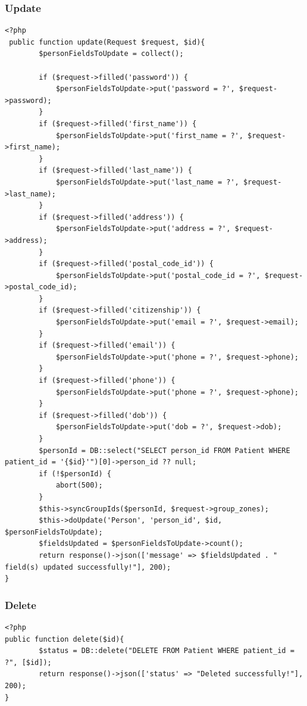 \documentclass{article}
\begin{document}
\subsubsection{Update}
\begin{verbatim}
<?php
 public function update(Request $request, $id){
        $personFieldsToUpdate = collect();

        if ($request->filled('password')) {
            $personFieldsToUpdate->put('password = ?', $request->password);
        }
        if ($request->filled('first_name')) {
            $personFieldsToUpdate->put('first_name = ?', $request->first_name);
        }
        if ($request->filled('last_name')) {
            $personFieldsToUpdate->put('last_name = ?', $request->last_name);
        }
        if ($request->filled('address')) {
            $personFieldsToUpdate->put('address = ?', $request->address);
        }
        if ($request->filled('postal_code_id')) {
            $personFieldsToUpdate->put('postal_code_id = ?', $request->postal_code_id);
        }
        if ($request->filled('citizenship')) {
            $personFieldsToUpdate->put('email = ?', $request->email);
        }
        if ($request->filled('email')) {
            $personFieldsToUpdate->put('phone = ?', $request->phone);
        }
        if ($request->filled('phone')) {
            $personFieldsToUpdate->put('phone = ?', $request->phone);
        }
        if ($request->filled('dob')) {
            $personFieldsToUpdate->put('dob = ?', $request->dob);
        }
        $personId = DB::select("SELECT person_id FROM Patient WHERE patient_id = '{$id}'")[0]->person_id ?? null;
        if (!$personId) {
            abort(500);
        }
        $this->syncGroupIds($personId, $request->group_zones);
        $this->doUpdate('Person', 'person_id', $id, $personFieldsToUpdate);
        $fieldsUpdated = $personFieldsToUpdate->count();
        return response()->json(['message' => $fieldsUpdated . " field(s) updated successfully!"], 200);
}

\end{verbatim}
\subsubsection{Delete}
\begin{verbatim}
<?php
public function delete($id){
        $status = DB::delete("DELETE FROM Patient WHERE patient_id = ?", [$id]);
        return response()->json(['status' => "Deleted successfully!"], 200);
}

\end{verbatim}
\end{document}
